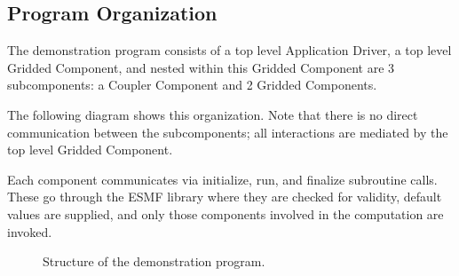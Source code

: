 
\subsection{Program Organization}

The demonstration program consists of a top level Application
Driver, a top level Gridded Component, and nested within this Gridded
Component are 3 subcomponents: a Coupler Component and 2 Gridded Components.

The following diagram shows this organization.  Note that there
is no direct communication between the subcomponents; all
interactions are mediated by the top level Gridded Component.

Each component communicates via initialize, run, and finalize
subroutine calls.  These go through the ESMF library where
they are checked for validity, default values are supplied,
and only those components involved in the computation are
invoked.


\begin{figure}[bpht]
\caption[Components]{Structure of the demonstration program.}
\label{fig:democomps}
\begin{center}
\end{center}
\end{figure}


